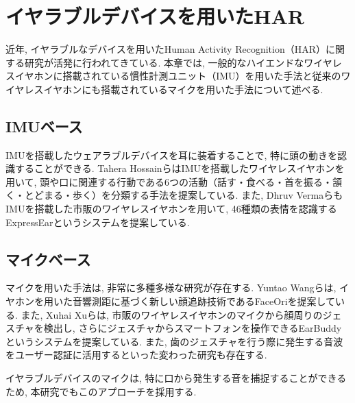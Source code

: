 
\section{イヤラブルデバイスを用いたHAR}

近年, イヤラブルなデバイスを用いたHuman Activity Recognition（HAR）に関する研究が活発に行われてきている. 本章では, 一般的なハイエンドなワイヤレスイヤホンに搭載されている慣性計測ユニット（IMU）を用いた手法と従来のワイヤレスイヤホンにも搭載されているマイクを用いた手法について述べる.

\subsection{IMUベース}

IMUを搭載したウェアラブルデバイスを耳に装着することで, 特に頭の動きを認識することができる. Tahera HossainらはIMUを搭載したワイヤレスイヤホンを用いて, 頭や口に関連する行動である6つの活動（話す・食べる・首を振る・頷く・とどまる・歩く）を分類する手法を提案している\cite{10.1145/3341162.3343822}. また, Dhruv VermaらもIMUを搭載した市販のワイヤレスイヤホンを用いて, 46種類の表情を認識するExpressEarというシステムを提案している\cite{10.1145/3478085}.

\subsection{マイクベース}

マイクを用いた手法は, 非常に多種多様な研究が存在する. Yuntao Wangらは, イヤホンを用いた音響測距に基づく新しい顔追跡技術であるFaceOriを提案している\cite{10.1145/3491102.3517698}. また, Xuhai Xuらは, 市販のワイヤレスイヤホンのマイクから顔周りのジェスチャを検出し, さらにジェスチャからスマートフォンを操作できるEarBuddyというシステムを提案している\cite{10.1145/3313831.3376836}. また, 歯のジェスチャを行う際に発生する音波をユーザー認証に活用するといった変わった研究も存在する\cite{10.1145/3460120.3485340}.

イヤラブルデバイスのマイクは, 特に口から発生する音を捕捉することができるため, 本研究でもこのアプローチを採用する.

